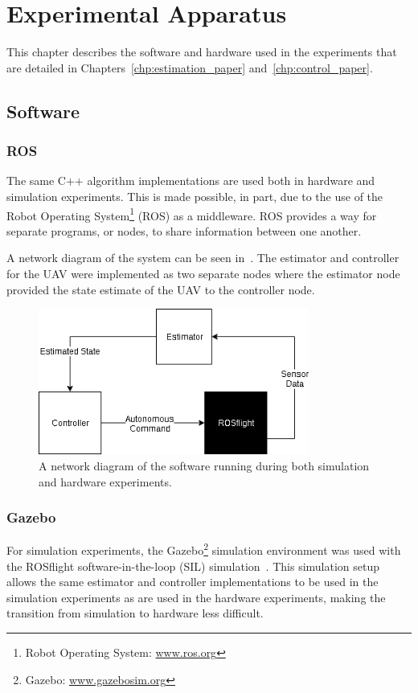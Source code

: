 
\chapter{Experimental Apparatus}
\label{chp:experimental_apparatus}

This chapter describes the software and hardware used in the experiments that
are detailed in Chapters~\ref{chp:estimation_paper} and~\ref{chp:control_paper}.

\section{Software}
\subsection {ROS}
The same C++ algorithm implementations are used both in hardware and simulation
experiments.
This is made possible, in part, due to the use of the Robot Operating System\footnote{Robot Operating System:
\href{www.ros.org}{www.ros.org}} (ROS) as a middleware. ROS provides a way for separate
programs, or nodes, to share information between one another.

A network diagram of the system can be seen in~. The estimator and
controller for the UAV were implemented as two separate nodes where the
estimator node provided the state estimate of the UAV to the controller node.

\begin{figure}[htbp]
  \centering
  \includegraphics[width=3.5in]{figures/roscopter.png}
  \caption[Software Architecture Network Diagram]{A network diagram of the
  software running during both simulation and hardware experiments.}
%
  \label{fig:network_diagram}
\end{figure}

\subsection {Gazebo}
For simulation experiments, the Gazebo\footnote{Gazebo:
\href{www.gazebosim.org}{www.gazebosim.org}} simulation environment was used with the ROSflight software-in-the-loop
(SIL) simulation~\cite{jackson2016rosflight}. This simulation setup allows the
same estimator and controller implementations to
be used in the simulation experiments as are used in the hardware experiments,
making the transition from simulation to hardware less difficult.


